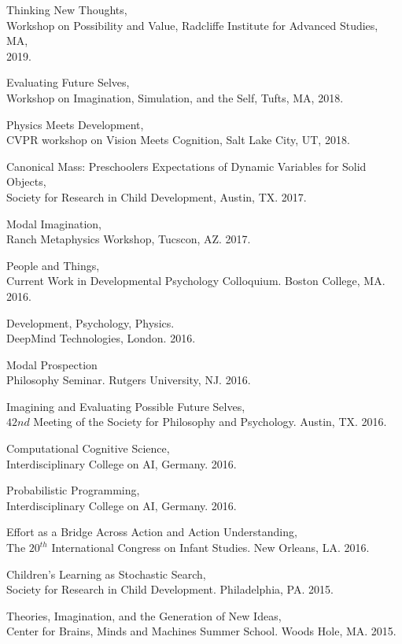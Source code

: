 \documentclass[margin,line,pifont,palatino,courier]{res}
\begin{document}
\begin{resume}
Thinking New Thoughts,\\
Workshop on Possibility and Value, Radcliffe Institute for Advanced Studies, MA,\\
2019.

Evaluating Future Selves,\\
Workshop on Imagination, Simulation, and the Self, Tufts, MA, 2018.

Physics Meets Development,\\
CVPR workshop on Vision Meets Cognition, Salt Lake City, UT, 2018.

Canonical Mass: Preschoolers Expectations of Dynamic Variables for Solid Objects,\\
Society for Research in Child Development, Austin, TX. 2017.

Modal Imagination,\\ Ranch Metaphysics Workshop, Tucscon, AZ. 2017.

People and Things,\\ Current Work in Developmental Psychology Colloquium. Boston College, MA. 2016. 

Development, Psychology, Physics. \\DeepMind Technologies, London. 2016. 

Modal Prospection \\ Philosophy Seminar. Rutgers University, NJ. 2016.

Imagining and Evaluating Possible Future Selves, \\ $42nd$ Meeting of the Society for Philosophy and Psychology. Austin, TX. 2016.

Computational Cognitive Science,\\ Interdisciplinary College on AI, Germany. 2016. 

Probabilistic Programming,\\ Interdisciplinary College on AI, Germany. 2016. 

Effort as a Bridge Across Action and Action Understanding,\\
The $20^{th}$ International Congress on Infant Studies. New Orleans, LA. 2016.

Children's Learning as Stochastic Search, \\Society for Research in Child Development. Philadelphia, PA. 2015.

Theories, Imagination, and the Generation of New Ideas, \\Center for Brains, Minds and Machines Summer School. Woods Hole, MA. 2015.


\end{resume}
\end{document}
